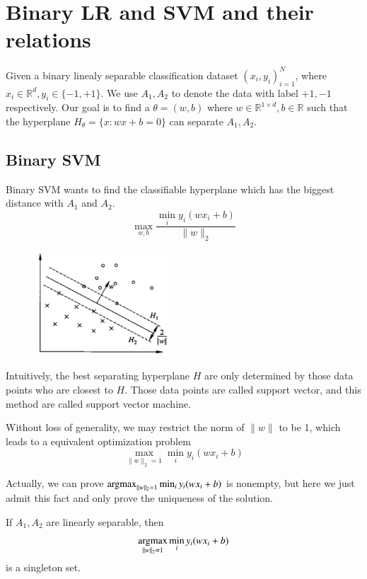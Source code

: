 \newpage
\section{Binary LR and SVM and their relations}
Given a binary linealy separable classification dataset ${(x_i,y_i)}_{i = 1}^N$, where $x_i\in \mathbb{R}^d, y_i\in \{-1,+1\}$. We use $A_1,A_2$ to denote the data with label $+1,-1$ respectively. Our goal is to find a $\theta = (w,b)$ where $w\in \mathbb{R}^{1\times d}, b\in \mathbb{R}$ such that the hyperplane $H_{\theta} = \{x:wx + b = 0\}$ can separate $A_1,A_2$.

\subsection{Binary SVM}
Binary SVM wants to find the classifiable hyperplane which has the biggest distance with $A_1$ and $A_2$.
\begin{equation}
	\max_{w,b} \frac{\min_{i} y_i(wx_i+b)}{\|w\|_2}
\end{equation}

\begin{figure}
	\centering
	\includegraphics[width = 2in]{margin}
\end{figure}

Intuitively, the best separating hyperplane $H$ are only determined by those data points who are closest to $H$. Those data points are called {support vector}, and this method are called {support vector machine}.

Without loss of generality, we may restrict the norm of $\|w\|$ to be 1, which leads to a equivalent optimization problem
\begin{equation}
\max_{\|w\|_2 = 1} \min_{i} y_i(wx_i+b)
\end{equation}

Actually, {we can prove $\mathop{\rm argmax}_{\|w\|_2 = 1} \min_{i} y_i(wx_i+b)$ is nonempty, but here we just admit this fact and only prove the uniqueness of the solution.}

\begin{lemma}
	If $A_1,A_2$ are linearly separable, then
	\begin{equation}\label{binarySVM}
		\mathop{\rm argmax}_{\|w\|_2 = 1} \min_{i} y_i(wx_i+b)
	\end{equation}
	 is a singleton set.
\end{lemma}

